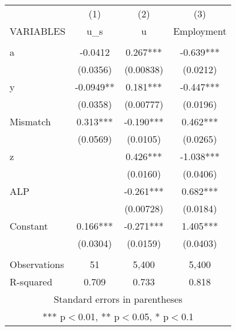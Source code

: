 \documentclass[]{article}
\begin{document}
\begin{tabular}{lccc} \hline
 & (1) & (2) & (3) \\
VARIABLES & u\_s & u & Employment \\ \hline
 &  &  &  \\
a & -0.0412 & 0.267*** & -0.639*** \\
 & (0.0356) & (0.00838) & (0.0212) \\
y & -0.0949** & 0.181*** & -0.447*** \\
 & (0.0358) & (0.00777) & (0.0196) \\
Mismatch & 0.313*** & -0.190*** & 0.462*** \\
 & (0.0569) & (0.0105) & (0.0265) \\
z &  & 0.426*** & -1.038*** \\
 &  & (0.0160) & (0.0406) \\
ALP &  & -0.261*** & 0.682*** \\
 &  & (0.00728) & (0.0184) \\
Constant & 0.166*** & -0.271*** & 1.405*** \\
 & (0.0304) & (0.0159) & (0.0403) \\
 &  &  &  \\
Observations & 51 & 5,400 & 5,400 \\
 R-squared & 0.709 & 0.733 & 0.818 \\ \hline
\multicolumn{4}{c}{ Standard errors in parentheses} \\
\multicolumn{4}{c}{ *** p$<$0.01, ** p$<$0.05, * p$<$0.1} \\
\end{tabular}
\end{document}

